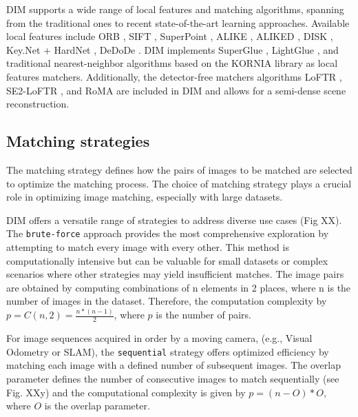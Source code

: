 DIM supports a wide range of local features and matching algorithms, spanning from the traditional ones to recent state-of-the-art learning approaches. 
Available local features include ORB \citep{Rublee2011}, SIFT \citep{Lowe2004}, SuperPoint \citep{DeTone_2018}, 
ALIKE \citep{zhao2022alike}, ALIKED \citep{zhao2023aliked}, DISK \citep{tyszkiewicz2020disk},
Key.Net \citep{barrosolaguna2019keynet} + HardNet \citep{pultar2020improving}, DeDoDe \citep{edstedt2024dedode}.
DIM implements SuperGlue \citep{sarlin2020superglue}, LightGlue \citep{lindenberger2023lightglue}, and traditional nearest-neighbor algorithms based on the KORNIA library \citep{riba2019kornia} as local features matchers. 
Additionally, the detector-free matchers algorithms LoFTR \citep{sun2021_loftr}, SE2-LoFTR \citep{Bkman2022_se2loftr}, and RoMA \citep{edstedt2023roma} are included in DIM and allows for a semi-dense scene reconstruction.

\subsection{Matching strategies}\label{sec:5:matching_stategies}

The matching strategy defines how the pairs of images to be matched are selected to optimize the matching process. The choice of matching strategy plays a crucial role in optimizing image matching, especially with large datasets.  

DIM offers a versatile range of strategies to address diverse use cases (Fig XX). 
The \texttt{brute-force} approach provides the most comprehensive exploration by attempting to match every image with every other. 
This method is computationally intensive but can be valuable for small datasets or complex scenarios where other strategies may yield insufficient matches. 
The image pairs are obtained by computing combinations of n elements in 2 places, where n is the number of images in the dataset. 
Therefore, the computation complexity by $ p = C(n,2) = \frac{n*\left(n-1\right)}{2}$, where $p$ is the number of pairs.

For image sequences acquired in order by a moving camera, (e.g., Visual Odometry or SLAM), the \texttt{sequential} strategy offers optimized efficiency by matching each image with a defined number of subsequent images. 
The overlap parameter defines the number of consecutive images to match sequentially (see Fig. XXy) and the computational complexity is given by $p = \left(n-O\right) * O $, where $O$ is the overlap parameter.

